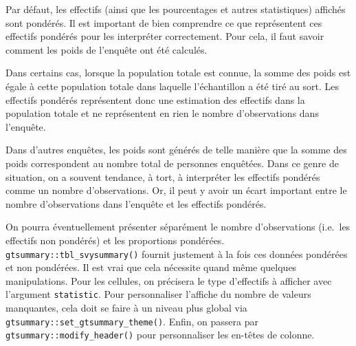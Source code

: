 \documentclass[
  letterpaper,
  DIV=11,
  numbers=noendperiod,
  oneside]{scrreprt}
\begin{document}
\begin{tcolorbox}[enhanced jigsaw, colbacktitle=quarto-callout-important-color!10!white, opacityback=0, toprule=.15mm, colback=white, coltitle=black, bottomtitle=1mm, toptitle=1mm, titlerule=0mm, rightrule=.15mm, title=\textcolor{quarto-callout-important-color}{\faExclamation}\hspace{0.5em}{Important}, breakable, bottomrule=.15mm, opacitybacktitle=0.6, arc=.35mm, left=2mm, leftrule=.75mm, colframe=quarto-callout-important-color-frame]

Par défaut, les effectifs (ainsi que les pourcentages et autres
statistiques) affichés sont pondérés. Il est important de bien
comprendre ce que représentent ces effectifs pondérés pour les
interpréter correctement. Pour cela, il faut savoir comment les poids de
l'enquête ont été calculés.

Dans certains cas, lorsque la population totale est connue, la somme des
poids est égale à cette population totale dans laquelle l'échantillon a
été tiré au sort. Les effectifs pondérés représentent donc une
estimation des effectifs dans la population totale et ne représentent en
rien le nombre d'observations dans l'enquête.

Dans d'autres enquêtes, les poids sont générés de telle manière que la
somme des poids correspondent au nombre total de personnes enquêtées.
Dans ce genre de situation, on a souvent tendance, à tort, à interpréter
les effectifs pondérés comme un nombre d'observations. Or, il peut y
avoir un écart important entre le nombre d'observations dans l'enquête
et les effectifs pondérés.

On pourra éventuellement présenter séparément le nombre d'observations
(i.e.~les effectifs non pondérés) et les proportions pondérées.
\texttt{gtsummary::tbl\_svysummary()} fournit justement à la fois ces
données pondérées et non pondérées. Il est vrai que cela nécessite quand
même quelques manipulations. Pour les cellules, on précisera le type
d'effectifs à afficher avec l'argument \texttt{statistic}. Pour
personnaliser l'affiche du nombre de valeurs manquantes, cela doit se
faire à un niveau plus global via
\texttt{gtsummary::set\_gtsummary\_theme()}. Enfin, on passera par
\texttt{gtsummary::modify\_header()} pour personnaliser les en-têtes de
colonne.


\end{tcolorbox}
\end{document}
